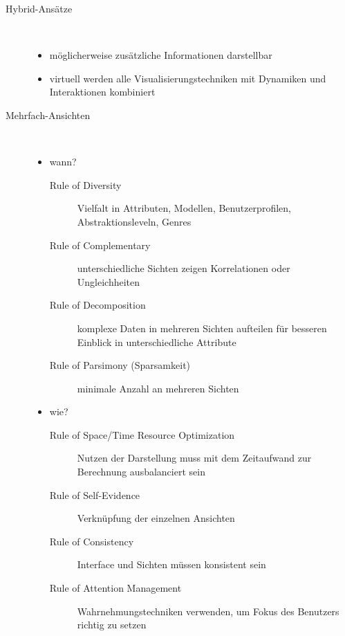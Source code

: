 \begin{description}
	\item[Hybrid-Ansätze] \ \\\vspace*{-\baselineskip}
		\begin{itemize}
			\item möglicherweise zusätzliche Informationen darstellbar
			\item virtuell werden alle Visualisierungstechniken mit Dynamiken und Interaktionen kombiniert
		\end{itemize}
	\item[Mehrfach-Ansichten] \ \\\vspace*{-\baselineskip}
		\begin{itemize}
			\item wann?
				\begin{description}
					\item[Rule of Diversity] Vielfalt in Attributen, Modellen, Benutzerprofilen, Abstraktionsleveln, Genres
					\item[Rule of Complementary] unterschiedliche Sichten zeigen Korrelationen oder Ungleichheiten
					\item[Rule of Decomposition] komplexe Daten in mehreren Sichten aufteilen für besseren Einblick in unterschiedliche Attribute
					\item[Rule of Parsimony (Sparsamkeit)] minimale Anzahl an mehreren Sichten
				\end{description}
			\item wie?
				\begin{description}
					\item[Rule of Space/Time Resource Optimization] Nutzen der Darstellung muss mit dem Zeitaufwand zur Berechnung ausbalanciert sein
					\item[Rule of Self-Evidence] Verknüpfung der einzelnen Ansichten
					\item[Rule of Consistency] Interface und Sichten müssen konsistent sein
					\item[Rule of Attention Management] Wahrnehmungstechniken verwenden, um Fokus des Benutzers richtig zu setzen
				\end{description}
		\end{itemize}
\end{description}